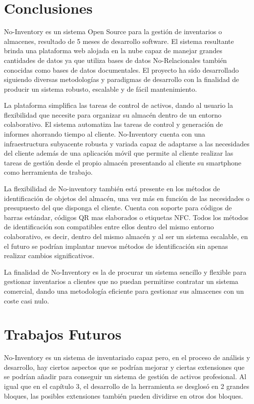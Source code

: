 \documentclass[a4paper,11pt]{book}
\begin{document}
\section{Conclusiones}

No-Inventory es un sistema Open Source para la gestión de inventarios o almacenes, resultado de 5 meses de desarrollo software. El sistema resultante brinda una plataforma web alojada en la nube capaz de manejar grandes cantidades de datos ya que utiliza bases de datos No-Relacionales también conocidas como bases de datos documentales. El proyecto ha sido desarrollado siguiendo diversas metodologías y paradigmas de desarrollo con la finalidad de producir un sistema robusto, escalable y de fácil mantenimiento. 

La plataforma simplifica las tareas de control de activos, dando al usuario la flexibilidad que necesite para organizar su almacén dentro de un entorno colaborativo. El sistema automatiza las tareas de control y generación de informes  ahorrando tiempo al cliente. No-Inventory cuenta con una infraestructura subyacente robusta y variada capaz de adaptarse a las necesidades del cliente además de una aplicación móvil que permite al cliente realizar las tareas de gestión desde el propio almacén presentando al cliente su smartphone como herramienta de trabajo. 

La flexibilidad de No-inventory también está presente en los métodos de identificación  de objetos del almacén, una vez más en función de las necesidades o presupuesto del que disponga el cliente. Cuenta con soporte para códigos de barras estándar, códigos QR mas elaborados o etiquetas NFC. Todos los métodos de identificación son compatibles entre ellos dentro del mismo entorno colaborativo, es decir, dentro del mismo almacén y al ser un sistema escalable, en el futuro se podrían implantar nuevos métodos de identificación sin apenas realizar cambios significativos. 
 

La finalidad de No-Inventory es la de procurar un sistema sencillo y flexible para gestionar inventarios  a clientes que no puedan permitirse contratar un sistema comercial, dando una metodología eficiente para gestionar sus almacenes con un coste casi nulo. 

\section{Trabajos Futuros}
No-Inventory es un sistema de inventariado capaz pero, en el proceso de análisis y desarrollo, hay ciertos aspectos que se podrían mejorar y ciertas extensiones que se podrían añadir para conseguir un sistema de gestión de activos profesional. Al igual que en el capítulo 3, el desarrollo de la herramienta se desglosó en 2 grandes bloques, las posibles extensiones también pueden dividirse en otros dos bloques. 
\end{document}
